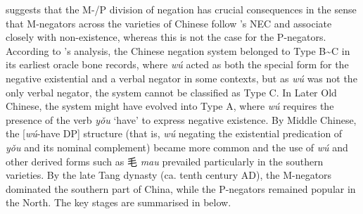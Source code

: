 \documentclass[output=paper]{langscibook}
\begin{document}
\citet{Zhang2002} suggests that the M-/P division of negation has crucial consequences in the sense that M-negators across the varieties of Chinese follow \citeauthor{Croft1991}'s NEC and associate closely with non-existence, whereas this is not the case for the P-negators. According to \citeauthor{Zhang2002}'s analysis, the Chinese negation system belonged to Type B\sim C in its earliest oracle bone records, where \textit{wú} acted as both the special form for the negative existential and a verbal negator in some contexts, but as \textit{wú} was not the only verbal negator, the system cannot be classified as Type C. In Later Old Chinese, the system might have evolved into Type A, where \textit{wú} requires the presence of the verb \textit{yǒu} `have' to express negative existence. By Middle Chinese, the [\textit{wú}-have DP] structure (that is, \textit{wú} negating the existential predication of \textit{yǒu} and its nominal complement) became more common and the use of \textit{wú} and other derived forms such as 毛 \textit{mau} prevailed particularly in the southern varieties. By the late Tang dynasty (ca. tenth century AD), the M-negators dominated the southern part of China, while the P-negators remained popular in the North. The key stages are summarised in  below.
\end{document}
